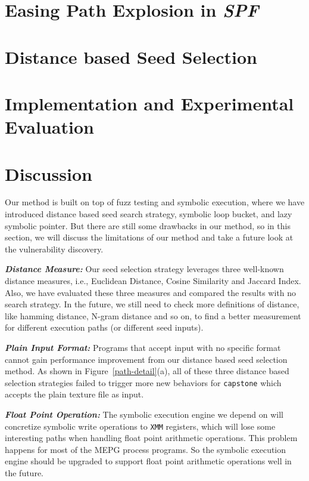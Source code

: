 \documentclass[a4paper]{article}
\begin{document}
\section{Easing Path Explosion in \textit{SPF}} \label{sec:ease PE}


\section{Distance based Seed Selection} \label{sec:seed selection}


\section{Implementation and Experimental Evaluation} \label{sec:evaluate}




\section{Discussion} \label{sec:discussion}
Our method is built on top of fuzz testing and symbolic execution, where we have introduced distance based seed search strategy, symbolic loop bucket, and lazy symbolic pointer. But there are still some drawbacks in our method, so in this section, we will discuss the limitations of our method and take a future look at the vulnerability discovery.

\noindent\textit{\textbf{Distance Measure:}} Our seed selection strategy leverages three well-known distance measures, i.e., Euclidean Distance, Cosine Similarity and Jaccard Index. Also, we have evaluated these three measures and compared the results with no search strategy. In the future, we still need to check more definitions of distance, like hamming distance, N-gram distance and so on, to find a better measurement for different execution paths (or different seed inputs). 

\noindent\textit{\textbf{Plain Input Format:}} Programs that accept input with no specific format cannot gain performance improvement from our distance based seed selection method.
 As shown in Figure~\ref{path-detail}(a), all of these three distance based selection strategies failed to trigger more new behaviors for \texttt{capstone} which accepts the plain texture file as input. 

\noindent\textit{\textbf{Float Point Operation:}} The symbolic execution engine we depend on will concretize symbolic write operations to \texttt{XMM} registers, which will lose some interesting paths when handling float point arithmetic operations. This problem happens for most of the MEPG process programs. So the symbolic execution engine should be upgraded to support float point arithmetic operations well in the future.
\end{document}
